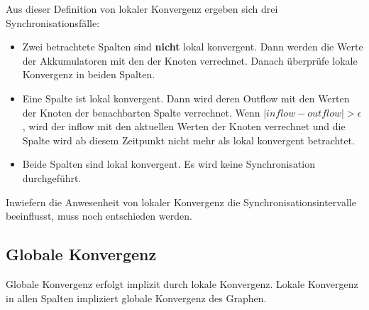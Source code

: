 Aus dieser Definition von lokaler Konvergenz ergeben sich drei Synchronisationsfälle:
\begin{itemize}
	\item Zwei betrachtete Spalten sind \textbf{nicht} lokal konvergent. Dann werden die Werte der Akkumulatoren mit den der Knoten verrechnet. Danach überprüfe lokale Konvergenz in beiden Spalten.
	\item Eine Spalte ist lokal konvergent. Dann wird deren Outflow mit den Werten der Knoten der benachbarten Spalte verrechnet. Wenn $ |inflow - outflow |  > \epsilon$, wird der inflow mit den aktuellen Werten der Knoten verrechnet und die Spalte wird ab diesem Zeitpunkt nicht mehr als lokal konvergent betrachtet. 
	\item Beide Spalten sind lokal konvergent. Es wird keine Synchronisation durchgeführt.
\end{itemize}
Inwiefern die Anwesenheit von lokaler Konvergenz die Synchronisationsintervalle beeinflusst, muss noch entschieden werden.
 
\subsection{Globale Konvergenz}
Globale Konvergenz erfolgt implizit durch lokale Konvergenz. Lokale Konvergenz in allen Spalten impliziert globale Konvergenz des Graphen.


